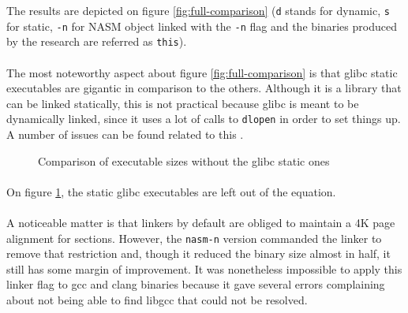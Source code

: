 \documentclass[12pt]{article}
\begin{document}
	The results are depicted on figure \ref{fig:full-comparison} (\verb|d| stands for dynamic, \verb|s| for static, \verb|-n| for \acrshort{NASM} object linked with the \verb|-n| flag and the binaries produced by the research are referred as \verb|this|).
	
	\paragraph{}The most noteworthy aspect about figure \ref{fig:full-comparison}  is that glibc static executables are gigantic in comparison to the others. Although it is a library that can be linked statically, this is not practical because glibc is meant to be dynamically linked, since it uses a lot of calls to \verb|dlopen| in order to set things up. A number of issues can be found related to this \cite{so-static-glibc}\cite{fasterthanlime}.

	\begin{figure}
		\caption{Comparison of executable sizes without the glibc static ones}
		\label{fig:pruned-comparison}
	\end{figure}
	
	\paragraph{}On figure \ref{fig:pruned-comparison}, the static glibc executables are left out of the equation.
	\paragraph{}A noticeable matter is that linkers by default are obliged to maintain a 4K page alignment for sections. However, the \verb|nasm-n| version commanded the linker to remove that restriction and, though it reduced the binary size almost in half, it still has some margin of improvement. It was nonetheless impossible to apply this linker flag to gcc and clang binaries because it gave several errors complaining about not being able to find libgcc that could not be resolved.
\end{document}

